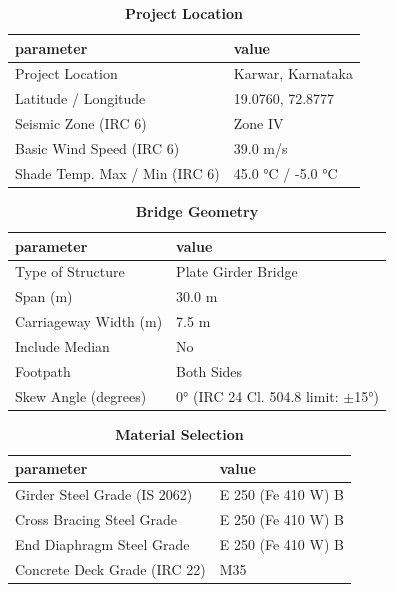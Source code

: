\documentclass[12pt,a4paper]{report}
\numberwithin{table}{chapter}
\numberwithin{figure}{chapter}
\begin{document}
\begin{table}[H]
\caption{\textbf{Project Location}}
\label{subsec:project-location}
\begin{tabular}{|L{5.5cm}|L{8.5cm}|}
\hline
\textbf{parameter} & \textbf{value} \\
\hline
\textnormal{Project Location} & Karwar, Karnataka \\
\hline
\textnormal{Latitude / Longitude} & 19.0760, 72.8777 \\
\hline
\textnormal{Seismic Zone (IRC 6)} & Zone IV \\
\hline
\textnormal{Basic Wind Speed (IRC 6)} & 39.0 m/s \\
\hline
\textnormal{Shade Temp. Max / Min (IRC 6)} & 45.0 °C / -5.0 °C \\
\hline
\end{tabular}
\vspace{0.4cm}
\end{table}

\begin{table}[H]
\caption{\textbf{Bridge Geometry}}
\label{subsec:bridge-geometry}
\begin{tabular}{|L{5.5cm}|L{8.5cm}|}
\hline
\textbf{parameter} & \textbf{value} \\
\hline
\textnormal{Type of Structure} & Plate Girder Bridge \\
\hline
\textnormal{Span (m)} & 30.0 m \\
\hline
\textnormal{Carriageway Width (m)} & 7.5 m \\
\hline
\textnormal{Include Median} & No \\
\hline
\textnormal{Footpath} & Both Sides \\
\hline
\textnormal{Skew Angle (degrees)} & 0° (IRC 24 Cl. 504.8 limit: $\pm$15°) \\
\hline
\end{tabular}
\end{table}
\vspace{0.4cm}

\begin{table}[H]
\caption{\textbf{Material Selection}}
\label{subsec:material}
\begin{tabular}{|L{5.5cm}|L{8.5cm}|}
\hline
\textbf{parameter} & \textbf{value} \\
\hline
\textnormal{Girder Steel Grade (IS 2062)} & E 250 (Fe 410 W) B \\
\hline
\textnormal{Cross Bracing Steel Grade} & E 250 (Fe 410 W) B \\
\hline
\textnormal{End Diaphragm Steel Grade} & E 250 (Fe 410 W) B \\
\hline
\textnormal{Concrete Deck Grade (IRC 22)} & M35 \\
\hline
\end{tabular}
\end{table}
\vspace{0.4cm}
\end{document}
